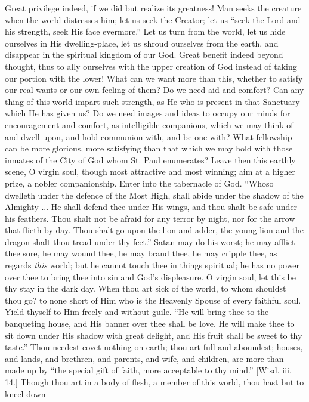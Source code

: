 Great privilege indeed, if we did but realize its greatness! Man
seeks the creature when the world distresses him; let us seek the
Creator; let us ``seek the Lord and his strength, seek His face
evermore.'' Let us turn from the world, let us hide ourselves in
His dwelling-place, let us shroud ourselves from the earth, and disappear in the spiritual kingdom of our God. Great benefit indeed
beyond thought, thus to ally ourselves with the upper creation of God
instead of taking our portion with the lower! What can we want more
than this, whether to satisfy our real wants or our own feeling of
them? Do we need aid and comfort? Can any thing of this world impart
such strength, as He who is present in that Sanctuary which He has
given us? Do we need images and ideas to occupy our minds for
encouragement and comfort, as intelligible companions, which we may
think of and dwell upon, and hold communion with, and be one with?
What fellowship can be more glorious, more satisfying than that which
we may hold with those inmates of the City of God whom St. Paul
enumerates? Leave then this earthly scene, O virgin soul, though most
attractive and most winning; aim at a higher prize, a nobler
companionship. Enter into the tabernacle of God. ``Whoso dwelleth
under the defence of the Most High, shall abide under the shadow of
the Almighty ... He shall defend thee under His wings, and thou shalt
be safe under his feathers. Thou shalt not be afraid for any terror by
night, nor for the arrow that flieth by day. Thou shalt go upon the
lion and adder, the young lion and the dragon shalt thou tread under
thy feet.'' Satan may do his worst; he may afflict thee sore, he
may wound thee, he may brand thee, he may cripple thee, as regards \emph{this}
world; but he cannot touch thee in things spiritual; he has no power
over thee to bring thee into sin and God's displeasure. O virgin soul,
let this be thy stay in the dark day. When thou art sick of the world,
to whom shouldst thou go? to none short of Him who is the Heavenly
Spouse of every faithful soul. Yield thyself to Him freely and without
guile. ``He will bring thee to the banqueting house, and His
banner over thee shall be love. He will make thee to sit down under
His shadow with great delight, and His fruit shall be sweet to thy
taste.'' Thou needest covet nothing on earth; thou art full and
aboundest; houses, and lands, and brethren, and parents, and wife, and
children, are more than made up by ``the special gift of faith,
more acceptable to thy mind.'' [Wisd. iii. 14.] Though thou art in
a body of flesh, a member of this world, thou hast but to kneel down
